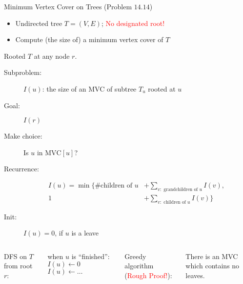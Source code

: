 
\begin{frame}{}
  \centerline{}
\end{frame}

\begin{frame}{}
  \begin{exampleblock}{Minimum Vertex Cover on Trees (Problem $14.14$)}
    \begin{itemize}
      \item Undirected tree $T = (V, E)$; \textcolor{red}{No designated root!}
      \item Compute (the size of) a minimum vertex cover of $T$
    \end{itemize}
  \end{exampleblock}

\end{frame}
\begin{frame}{}
  \centerline{Rooted $T$ at any node $r$.}
  \pause
  \vspace{0.30cm}

  \begin{description}
	\item[Subproblem:] $I(u)$: the size of an MVC of subtree $T_{u}$ rooted at $u$
	\item[Goal:] $I(r)$
	  \pause
	\item[Make choice:] Is $u$ in $\text{MVC}[u]$?
	\item[Recurrence:] 
	  \begin{align*}
		I(u) = \min \{\text{\# children of } u &+ \sum_{v: \text{ grandchildren of } u} I(v), \\
			1 &+ \sum_{v: \text{ children of } u} I(v)\}
	  \end{align*}
	  \pause
	\item[Init:] $I(u) = 0$, if $u$ is a leave
  \end{description}
\end{frame}
\begin{frame}{}
  \begin{columns}
	  DFS on $T$ from root $r$:

	  \vspace{0.50cm}
	  \begin{algorithmic}
		\State when $u$ is ``finished'':
		  \State $I(u) \gets 0$
		\Else
		  \State $I(u) \gets \dots$ 
		\EndIf
	  \end{algorithmic}
	  \pause
	Greedy algorithm (\textcolor{red}{Rough Proof!}):

	  \vspace{0.50cm}
	  \begin{theorem}
		There is an MVC which contains no leaves.
	  \end{theorem}
  \end{columns}
\end{frame}
